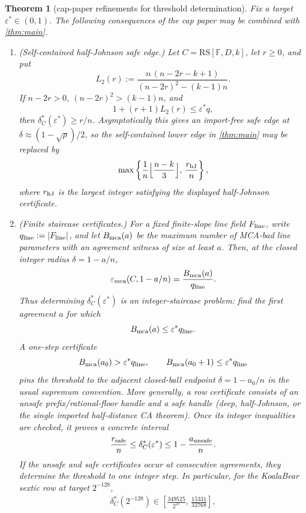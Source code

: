 \documentclass[11pt]{amsart}
\newtheorem{theorem}{Theorem}[section]
\theoremstyle{definition}
\theoremstyle{remark}
\newcommand{\F}{\mathbb{F}}
\newcommand{\RS}{\mathrm{RS}}
\newcommand{\emca}{\varepsilon_{\mathrm{mca}}}
\begin{document}
\begin{theorem}[cap-paper refinements for threshold determination]\label{thm:cap-paper-package}
Fix a target $\varepsilon^*\in(0,1)$. The following consequences of the cap paper \cite{Cho26b} may be combined with \cref{thm:main}.
\begin{enumerate}
\item \textup{(Self-contained half-Johnson safe edge.)} Let $C=\RS[\F,D,k]$, let $r\ge0$, and put
\[
        L_2(r):=
        \frac{n\,(n-2r-k+1)}
             {(n-2r)^2-(k-1)n}.
\]
If $n-2r>0$, $(n-2r)^2>(k-1)n$, and
\[
        1+(r+1)L_2(r)\le \varepsilon^* q,
\]
then $\delta^*_C(\varepsilon^*)\ge r/n$.  Asymptotically this gives an import-free safe edge at $\delta\approx(1-\sqrt\rho)/2$, so the self-contained lower edge in \cref{thm:main} may be replaced by
\[
        \max\left\{\frac1n\Bigl\lfloor\frac{n-k}{3}\Bigr\rfloor,\,
        \frac{r_{\rm hJ}}n\right\},
\]
where $r_{\rm hJ}$ is the largest integer satisfying the displayed half-Johnson certificate.
\item \textup{(Finite staircase certificates.)} For a fixed finite-slope line field $F_{\rm line}$, write $q_{\rm line}:=|F_{\rm line}|$, and let $B_{\rm mca}(a)$ be the maximum number of MCA-bad line parameters with an agreement witness of size at least $a$.  Then, at the closed integer radius $\delta=1-a/n$,
\[
        \emca(C,1-a/n)=\frac{B_{\rm mca}(a)}{q_{\rm line}} .
\]
Thus determining $\delta^*_C(\varepsilon^*)$ is an integer-staircase problem: find the first agreement $a$ for which
\[
        B_{\rm mca}(a)\le \varepsilon^*q_{\rm line}.
\]
A one-step certificate
\[
        B_{\rm mca}(a_0)>\varepsilon^*q_{\rm line},
        \qquad
        B_{\rm mca}(a_0+1)\le \varepsilon^*q_{\rm line}
\]
pins the threshold to the adjacent closed-ball endpoint $\delta=1-a_0/n$ in the usual supremum convention. More generally, a row certificate consists of an unsafe prefix/rational-floor handle and a safe handle \textup{(deep, half-Johnson, or the single imported half-distance CA theorem)}.  Once its integer inequalities are checked, it proves a concrete interval
\[
        \frac{r_{\rm safe}}n
        \le
        \delta^*_C(\varepsilon^*)
        \le
        1-\frac{a_{\rm unsafe}}n .
\]
If the unsafe and safe certificates occur at consecutive agreements, they determine the threshold to one integer step.  In particular, for the KoalaBear sextic row at target $2^{-128}$,
\[
\begin{array}{ll}
        \delta^*_C(2^{-128})\in
        \left[\frac{349525}{2^{21}},\,\frac{15331}{32768}\right],

\end{array}\]
\end{enumerate}
\end{theorem}
\end{document}
